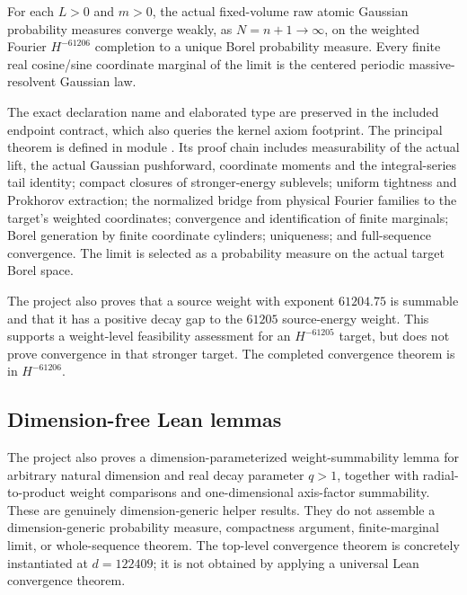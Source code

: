 \begin{theorem}\label{thm:122409}
For each $L>0$ and $m>0$, the actual fixed-volume raw atomic Gaussian probability measures converge weakly, as $N=n+1\to\infty$, on the weighted Fourier $H^{-61206}$ completion to a unique Borel probability measure. Every finite real cosine/sine coordinate marginal of the limit is the centered periodic massive-resolvent Gaussian law.
\end{theorem}

The exact declaration name and elaborated type are preserved in the included endpoint contract, which also queries the kernel axiom footprint. The principal theorem is defined in module . Its proof chain includes measurability of the actual lift, the actual Gaussian pushforward, coordinate moments and the integral-series tail identity; compact closures of stronger-energy sublevels; uniform tightness and Prokhorov extraction; the normalized bridge from physical Fourier families to the target's weighted coordinates; convergence and identification of finite marginals; Borel generation by finite coordinate cylinders; uniqueness; and full-sequence convergence. The limit is selected as a probability measure on the actual target Borel space.

\begin{remark}
The project also proves that a source weight with exponent $61204.75$ is summable and that it has a positive decay gap to the $61205$ source-energy weight. This supports a weight-level feasibility assessment for an $H^{-61205}$ target, but does not prove convergence in that stronger target. The completed convergence theorem is in $H^{-61206}$.
\end{remark}

\subsection{Dimension-free Lean lemmas}
The project also proves a dimension-parameterized weight-summability lemma for arbitrary natural dimension and real decay parameter $q>1$, together with radial-to-product weight comparisons and one-dimensional axis-factor summability. These are genuinely dimension-generic helper results. They do not assemble a dimension-generic probability measure, compactness argument, finite-marginal limit, or whole-sequence theorem. The top-level convergence theorem is concretely instantiated at $d=122409$; it is not obtained by applying a universal Lean convergence theorem.

